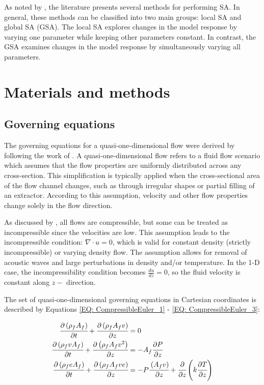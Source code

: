 \documentclass[a4paper,fleqn]{cas-dc}
\begin{document}
As noted by \citet{Gan2014}, the literature presents several methods for performing SA. In general, these methods can be classified into two main groups: local SA and global SA (GSA). The local SA explores changes in the model response by varying one parameter while keeping other parameters constant. In contrast, the GSA examines changes in the model response by simultaneously varying all parameters.


%
\section{Materials and methods} \label{CH: Materials and methods}

\subsection{Governing equations} \label{CH:Governing_equations_chapter}
The governing equations for a quasi-one-dimensional flow were derived by following the work of \citet{Anderson1995}. A quasi-one-dimensional flow refers to a fluid flow scenario which assumes that the flow properties are uniformly distributed across any cross-section. This simplification is typically applied when the cross-sectional area of the flow channel changes, such as through irregular shapes or partial filling of an extractor. According to this assumption, velocity and other flow properties change solely in the flow direction.

As discussed by \citet{Anderson2023}, all flows are compressible, but some can be treated as incompressible since the velocities are low. This assumption leads to the incompressible condition: $\nabla \cdot u =0$, which is valid for constant density (strictly incompressible) or varying density flow. The assumption allows for removal of acoustic waves and large perturbations in density and/or temperature. In the 1-D case, the incompressibility condition becomes $\frac{du}{dz} = 0$, so the fluid velocity is constant along $z-$ direction.

The set of quasi-one-dimensional governing equations in Cartesian coordinates is described by Equations \ref{EQ: CompressibleEuler_1} - \ref{EQ: CompressibleEuler_3}:

{\footnotesize
	\begin{align}
		\label{EQ: CompressibleEuler_1}
		\cfrac{\partial \left( \rho_f A_f \right) }{\partial t} + \cfrac{\partial \left( \rho_f A_f v \right)}{\partial z} &= 0 \\
		\cfrac{\partial \left( \rho_f v A_f \right) }{\partial t} + \cfrac{\partial \left( \rho_f A_f v^2 \right)}{\partial z} &= -A_f \cfrac{\partial P}{\partial z} \label{EQ: CompressibleEuler_2} \\
		\cfrac{\partial \left( \rho_f e A_f \right) }{\partial t} + \cfrac{\partial \left( \rho_f A_f v e\right)}{\partial z} &= -P\cfrac{\left( A_f v \right)}{\partial z} + \cfrac{\partial}{\partial z} \left( k \cfrac{\partial T}{\partial z} \right)   
		\label{EQ: CompressibleEuler_3}
	\end{align}  
}
\end{document}
